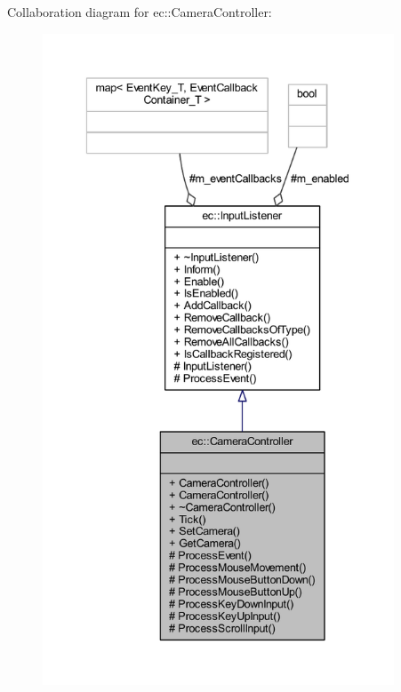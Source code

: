 Collaboration diagram for ec\+:\+:Camera\+Controller\+:
\nopagebreak
\begin{figure}[H]
\begin{center}
\leavevmode
\includegraphics[height=550pt]{classec_1_1_camera_controller__coll__graph}
\end{center}
\end{figure}
